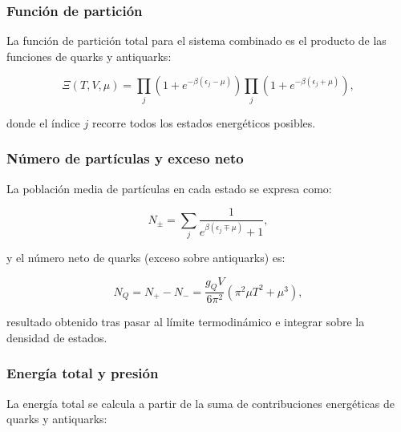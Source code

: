 
\subsubsection*{Función de partición}

La función de partición total para el sistema combinado es el producto de las funciones de quarks y antiquarks:

\begin{equation}
\Xi(T, V, \mu) = \prod_j \left(1 + e^{-\beta(\epsilon_j - \mu)}\right)
\prod_j \left(1 + e^{-\beta(\epsilon_j + \mu)}\right),
\end{equation}

donde el índice \( j \) recorre todos los estados energéticos posibles.


\subsubsection*{Número de partículas y exceso neto}

La población media de partículas en cada estado se expresa como:

\begin{equation}
N_\pm = \sum_j \frac{1}{e^{\beta(\epsilon_j \mp \mu)} + 1},
\end{equation}

y el número neto de quarks (exceso sobre antiquarks) es:

\begin{equation}\label{eq-FD-Excedente}
{N}_{Q} = N_+ - N_- = \frac{g_Q V}{6 \pi^2} \left( \pi^2 \mu T^2 + \mu^3 \right),
\end{equation}

resultado obtenido tras pasar al límite termodinámico e integrar sobre la densidad de estados.


\subsubsection*{Energía total y presión}

La energía total se calcula a partir de la suma de contribuciones energéticas de quarks y antiquarks:

